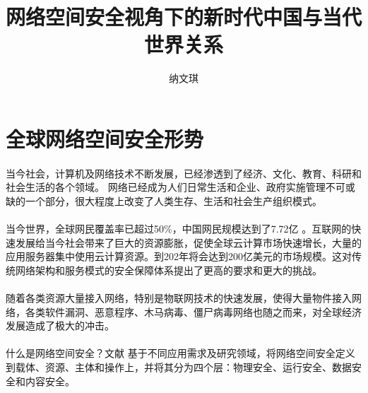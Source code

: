\documentclass[10pt,letterpaper]{article}
\begin{document}
 


\title{网络空间安全视角下的新时代中国与当代世界关系}

\author[*]{纳文琪}
\date{}
\maketitle



\section{全球网络空间安全形势}



\paragraph{} 当今社会，计算机及网络技术不断发展，已经渗透到了经济、文化、教育、科研和社会生活的各个领域。
网络已经成为人们日常生活和企业、政府实施管理不可或缺的一个部分，很大程度上改变了人类生存、生活和社会生产组织模式。
\paragraph{} 当今世界，全球网民覆盖率已超过50\%，中国网民规模达到了7.72亿\cite{2018中国互联网络发展状况统计报告} 。互联网的快速发展给当今社会带来了巨大的资源膨胀，促使全球云计算市场快速增长，大量的应用服务器集中使用云计算资源。到202年将会达到200亿美元的市场规模。这对传统网络架构和服务模式的安全保障体系提出了更高的要求和更大的挑战。
\paragraph{} 随着各类资源大量接入网络，特别是物联网技术的快速发展，使得大量物件接入网络，各类软件漏洞、恶意程序、木马病毒、僵尸病毒网络也随之而来，对全球经济发展造成了极大的冲击。
\paragraph{} 什么是网络空间安全？文献\cite{方滨兴2018定义网络空间安全} 基于不同应用需求及研究领域，将网络空间安全定义到载体、资源、主体和操作上，并将其分为四个层：物理安全、运行安全、数据安全和内容安全。
\end{document}
